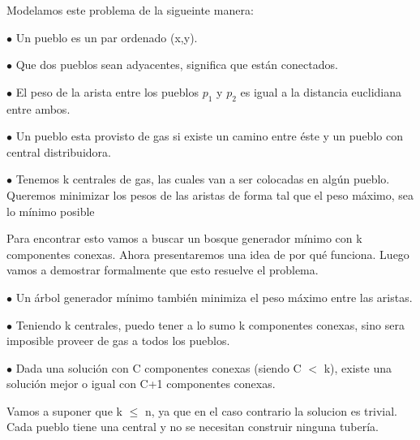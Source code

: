 Modelamos este problema de la sigueinte manera:

$\bullet$ Un pueblo es un par ordenado (x,y).

$\bullet$ Que dos pueblos sean adyacentes, significa que están conectados.

$\bullet$ El peso de la arista entre los pueblos $p_1$ y $p_2$ es igual a la distancia euclidiana entre ambos.

$\bullet$ Un pueblo esta provisto de gas si existe un camino entre éste y un pueblo con central distribuidora.

$\bullet$ Tenemos k centrales de gas, las cuales van a ser colocadas en algún pueblo. Queremos minimizar los pesos de las aristas de forma tal que el peso máximo, sea lo mínimo posible %

Para encontrar esto vamos a buscar un bosque generador mínimo con k componentes conexas. Ahora presentaremos una idea de por qué funciona. Luego vamos a demostrar formalmente que esto resuelve el problema.

$\bullet$ Un árbol generador mínimo también minimiza el peso máximo entre las aristas.

$\bullet$ Teniendo k centrales, puedo tener a lo sumo k componentes conexas, sino sera imposible proveer de gas a todos los pueblos.

$\bullet$ Dada una solución con C componentes conexas (siendo C $<$ k), existe una solución mejor o igual con C+1 componentes conexas.

Vamos a suponer que k $\leq$ n, ya que en el caso contrario la solucion es trivial. Cada pueblo tiene una central y no se necesitan construir ninguna tubería.